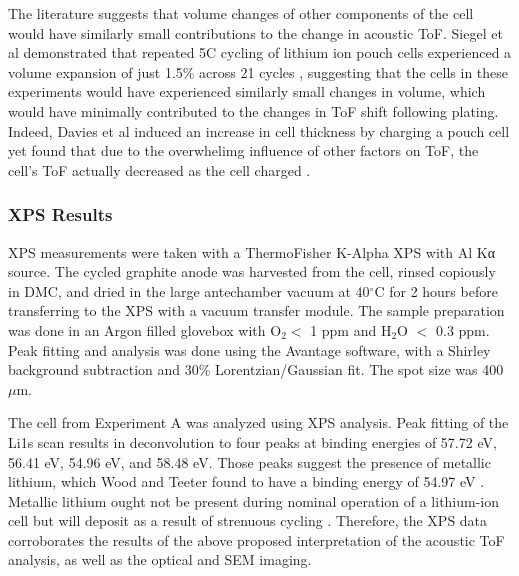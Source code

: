 The literature suggests that volume changes of other components of the cell would have similarly small contributions to the change in acoustic ToF. Siegel et al demonstrated that repeated 5C cycling of lithium ion pouch cells experienced a volume expansion of just 1.5\% across 21 cycles \cite{EXPANSION}, suggesting that the cells in these experiments would have experienced similarly small changes in volume, which would have minimally contributed to the changes in ToF shift following plating. Indeed, Davies et al induced an increase in cell thickness by charging a pouch cell yet found that due to the overwhelimg influence of other factors on ToF, the cell's ToF actually decreased as the cell charged \cite{SOC-SOH-EST}.

\subsubsection{XPS Results}
XPS measurements were taken with a ThermoFisher K-Alpha XPS with Al Kα source. The cycled graphite anode was harvested from the cell, rinsed copiously in DMC, and dried in the large antechamber vacuum at 40$^{\circ}$C for 2 hours before transferring to the XPS with a vacuum transfer module. The sample preparation was done in an Argon filled glovebox with O$_2 <$ 1 ppm and H$_2$O $<$ 0.3 ppm. Peak fitting and analysis was done using the Avantage software, with a Shirley background subtraction and 30\% Lorentzian/Gaussian fit. The spot size was 400 $\mu$m.

The cell from Experiment A was analyzed using XPS analysis. Peak fitting of the Li1s scan results in deconvolution to four peaks at binding energies of 57.72 eV, 56.41 eV, 54.96 eV, and 58.48 eV. Those peaks suggest the presence of metallic lithium, which Wood and Teeter found to have a binding energy of 54.97 eV \cite{BE}. Metallic lithium ought not be present during nominal operation of a lithium-ion cell but will deposit as a result of strenuous cycling \cite{lithium}. Therefore, the XPS data corroborates the results of the above proposed interpretation of the acoustic ToF analysis, as well as the optical and SEM imaging.

